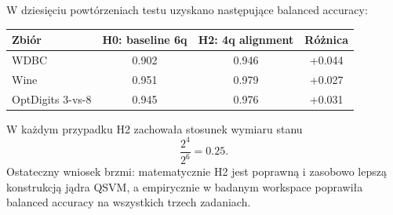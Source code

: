 \documentclass[11pt,a4paper]{article}
\begin{document}
W dziesięciu powtórzeniach testu uzyskano następujące balanced accuracy:

\begin{center}
\begin{tabular}{lccc}
\toprule
Zbiór & H0: baseline 6q & H2: 4q alignment & Różnica \\
\midrule
WDBC & 0.902 & 0.946 & +0.044 \\
Wine & 0.951 & 0.979 & +0.027 \\
OptDigits 3-vs-8 & 0.945 & 0.976 & +0.031 \\
\bottomrule
\end{tabular}
\end{center}

W każdym przypadku H2 zachowała stosunek wymiaru stanu
\[
\frac{2^4}{2^6}=0.25.
\]
Ostateczny wniosek brzmi: matematycznie H2 jest poprawną i zasobowo lepszą konstrukcją jądra QSVM, a empirycznie w badanym workspace poprawiła balanced accuracy na wszystkich trzech zadaniach.
\end{document}
